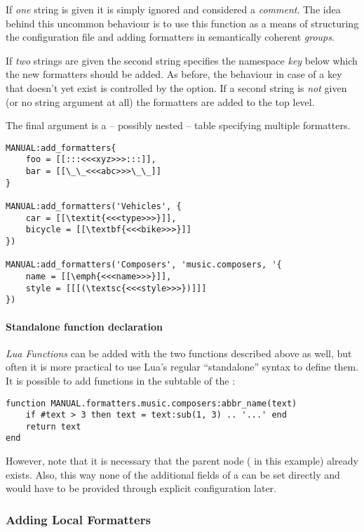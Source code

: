 \documentclass[12pt]{scrartcl}
\begin{document}
If \emph{one} string is given it is simply ignored and considered a
\emph{comment}. The idea behind this uncommon behaviour is to use this function
as a means of structuring the configuration file and adding formatters in
semantically coherent \emph{groups}.

If \emph{two} strings are given the second string specifies the namespace
\emph{key} below which the new formatters should be added.  As before, the
behaviour in case of a key that doesn't yet exist is controlled by the
 option.  If a second string is \emph{not} given (or no string
argument at all) the formatters are added to the top level.

The final argument is a -- possibly nested -- table specifying multiple
formatters.

\begin{verbatim}
MANUAL:add_formatters{
	foo = [[:::<<<xyz>>>:::]],
	bar = [[\_\_<<<abc>>>\_\_]]
}

MANUAL:add_formatters('Vehicles', {
	car = [[\textit{<<<type>>>}]],
	bicycle = [[\textbf{<<<bike>>>}]]
})

MANUAL:add_formatters('Composers', 'music.composers, '{
	name = [[\emph{<<<name>>>}]],
	style = [[[(\textsc{<<<style>>>})]]]
})
\end{verbatim}


\paragraph{Standalone function declaration}

\emph{Lua Functions} can be added with the two functions described above as
well, but often it is more practical to use Lua's regular “standalone” syntax to
define them.  It is possible to add functions in the 
subtable of the :

\begin{verbatim}
function MANUAL.formatters.music.composers:abbr_name(text)
	if #text > 3 then text = text:sub(1, 3) .. '...' end
    return text
end
\end{verbatim}

\noindent However, note that it is necessary that the parent node
( in this example) already exists.  Also,
this way none of the additional fields of a  can be
set directly and would have to be provided through explicit configuration later.


\subsubsection{Adding Local Formatters}
\label{sec:usage:adding-local-formatters}
\end{document}
